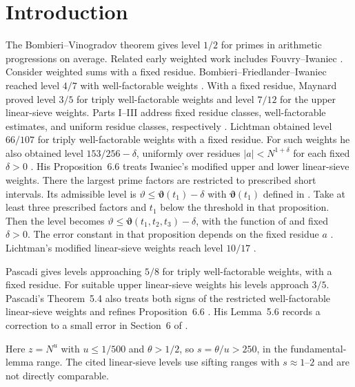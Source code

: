 \documentclass{amsart}
\numberwithin{equation}{section}
\theoremstyle{definition}
\theoremstyle{plain}
\begin{document}
\section{Introduction}
The Bombieri--Vinogradov theorem \cite{Bombieri65,Vinogradov65}
gives level $1/2$ for primes in arithmetic progressions on average.
Related early weighted work includes Fouvry--Iwaniec
\cite{FouvryIwaniec80,FouvryIwaniec83}.
Consider weighted sums with a fixed residue.
Bombieri--Friedlander--Iwaniec reached level $4/7$ with well-factorable
weights \cite[Theorem~10]{BFI86}.
With a fixed residue, Maynard \cite[Theorems~1.1--1.2]{MaynardII}
proved level $3/5$ for triply well-factorable weights and level $7/12$
for the upper linear-sieve weights. Parts I--III address fixed residue
classes, well-factorable estimates, and uniform residue classes, respectively
\cite{MaynardI,MaynardII,MaynardIII}.
Lichtman \cite[Theorem~1.7, (1.6)]{Lichtman23} obtained level $66/107$ for
triply well-factorable weights with a fixed residue. For such weights
he also obtained level $153/256-\delta$, uniformly over residues
$|a|<N^{1+\delta}$ for each fixed $\delta>0$
\cite[Theorem~1.7, (1.7)]{Lichtman23}. His Proposition~6.6 treats
Iwaniec's modified upper and lower linear-sieve weights. There the
largest prime factors are restricted to prescribed short intervals.
Its admissible level is
$\vartheta\le\boldsymbol{\vartheta}(t_1)-\delta$ with
$\boldsymbol{\vartheta}(t_1)$ defined in \cite[(6.2)]{Lichtman23}.
Take at least three prescribed factors and $t_1$ below the threshold
in that proposition. Then the level becomes
$\vartheta\le\boldsymbol{\vartheta}(t_1,t_2,t_3)-\delta$, with the
function of \cite[(6.4)]{Lichtman23} and fixed $\delta>0$.
The error constant in that proposition depends on the
fixed residue $a$ \cite[Proposition~6.6]{Lichtman23}. Lichtman's
modified linear-sieve weights reach level $10/17$ \cite{Lichtman21}.

\pagebreak
Pascadi \cite[Theorem~1.3]{Pascadi25} gives levels approaching $5/8$
for triply well-factorable weights, with a fixed residue. For suitable
upper linear-sieve weights his levels approach $3/5$.
Pascadi's Theorem~5.4 also treats both signs of the restricted
well-factorable linear-sieve weights and refines Proposition~6.6
\cite[Theorem~5.4]{Pascadi25}. His Lemma~5.6 records a correction to a
small error in Section~6 of \cite{Lichtman23}
\cite[Lemma~5.6]{Pascadi25}.

Here $z=N^u$ with $u\le1/500$ and $\theta>1/2$, so
$s=\theta/u>250$, in the fundamental-lemma range. The cited
linear-sieve levels use sifting ranges with $s\approx1$--$2$ and are
not directly comparable.
\end{document}
